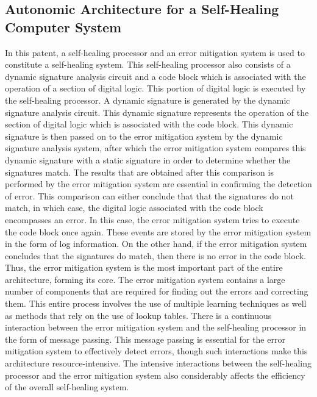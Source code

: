 \documentclass[conference]{IEEEtran}
\begin{document}
\subsection{Autonomic Architecture for a Self-Healing Computer System}
In this patent, a self-healing processor and an error mitigation system is used to constitute a self-healing system. This self-healing processor also consists of a dynamic signature analysis circuit and a code block which is associated with the operation of a section of digital logic. This portion of digital logic is executed by the self-healing processor.\cite{MELEN:2010} A dynamic signature is generated by the dynamic signature analysis circuit. This dynamic signature represents the operation of the section of digital logic which is associated with the code block. This dynamic signature is then passed on to the error mitigation system by the dynamic signature analysis system, after which the error mitigation system compares this dynamic signature with a static signature in order to determine whether the signatures match. The results that are obtained after this comparison is performed by the error mitigation system are essential in confirming the detection of error. This comparison can either conclude that that the signatures do not match, in which case, the digital logic associated with the code block encompasses an error. In this case, the error mitigation system tries to execute the code block once again. These events are stored by the error mitigation system in the form of log information. On the other hand, if the error mitigation system concludes that the signatures do match, then there is no error in the code block. Thus, the error mitigation system is the most important part of the entire architecture, forming its core. The error mitigation system contains a large number of components that are required for finding out the errors and correcting them. This entire process involves the use of multiple learning techniques as well as methods that rely on the use of lookup tables.
There is a continuous interaction between the error mitigation system and the self-healing processor in the form of message passing. This message passing is essential for the error mitigation system to effectively detect errors, though such interactions make this architecture resource-intensive. The intensive interactions between the self-healing processor and the error mitigation system also considerably affects the efficiency of the overall self-healing system.
\end{document}
